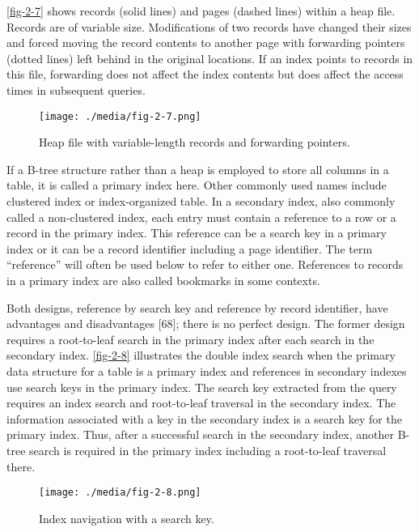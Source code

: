 \autoref{fig-2-7} shows records (solid lines) and pages (dashed lines) within a
heap file. Records are of variable size. Modifications of two records
have changed their sizes and forced moving the record contents to
another page with forwarding pointers (dotted lines) left behind in the
original locations. If an index points to records in this file,
forwarding does not affect the index contents but does affect the access
times in subsequent queries.

\begin{figure}
  \centering
  \texttt{[image: ./media/fig-2-7.png]}

  \caption{Heap file with variable-length records and forwarding pointers.\label{fig-2-7}}
\end{figure}

If a B-tree structure rather than a heap is employed to store all
columns in a table, it is called a primary index here. Other commonly
used names include clustered index or index-organized table. In a
secondary index, also commonly called a non-clustered index, each entry
must contain a reference to a row or a record in the primary index. This
reference can be a search key in a primary index or it can be a record
identifier including a page identifier. The term ``reference'' will
often be used below to refer to either one. References to records in a
primary index are also called bookmarks in some contexts.

Both designs, reference by search key and reference by record
identifier, have advantages and disadvantages {[}68{]}; there is no
perfect design. The former design requires a root-to-leaf search in the
primary index after each search in the secondary index. \autoref{fig-2-8}
illustrates the double index search when the primary data structure for
a table is a primary index and references in secondary indexes use
search keys in the primary index. The search key extracted from the
query requires an index search and root-to-leaf traversal in the
secondary index. The information associated with a key in the secondary
index is a search key for the primary index. Thus, after a successful
search in the secondary index, another B-tree search is required in the
primary index including a root-to-leaf traversal there.

\begin{figure}
  \centering
  \texttt{[image: ./media/fig-2-8.png]}

  \caption{Index navigation with a search key.\label{fig-2-8}}
\end{figure}

